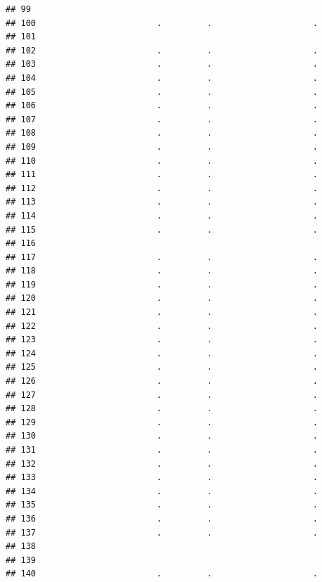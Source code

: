 \documentclass[
]{article}
\begin{document}
\begin{verbatim}
## 99                                                         
## 100                        .         .                    .
## 101                                                        
## 102                        .         .                    .
## 103                        .         .                    .
## 104                        .         .                    .
## 105                        .         .                    .
## 106                        .         .                    .
## 107                        .         .                    .
## 108                        .         .                    .
## 109                        .         .                    .
## 110                        .         .                    .
## 111                        .         .                    .
## 112                        .         .                    .
## 113                        .         .                    .
## 114                        .         .                    .
## 115                        .         .                    .
## 116                                                        
## 117                        .         .                    .
## 118                        .         .                    .
## 119                        .         .                    .
## 120                        .         .                    .
## 121                        .         .                    .
## 122                        .         .                    .
## 123                        .         .                    .
## 124                        .         .                    .
## 125                        .         .                    .
## 126                        .         .                    .
## 127                        .         .                    .
## 128                        .         .                    .
## 129                        .         .                    .
## 130                        .         .                    .
## 131                        .         .                    .
## 132                        .         .                    .
## 133                        .         .                    .
## 134                        .         .                    .
## 135                        .         .                    .
## 136                        .         .                    .
## 137                        .         .                    .
## 138                                                        
## 139                                                        
## 140                        .         .                    .

\end{verbatim}
\end{document}
